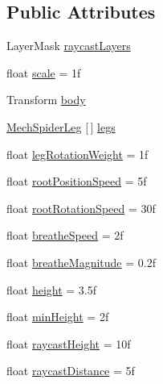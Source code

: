 \subsection*{Public Attributes}
\begin{DoxyCompactItemize}
\item 
Layer\+Mask \mbox{\hyperlink{class_root_motion_1_1_demos_1_1_mech_spider_af6d3d42998e9a682b4cca494695c46b2}{raycast\+Layers}}
\item 
float \mbox{\hyperlink{class_root_motion_1_1_demos_1_1_mech_spider_a4b5c11a7eb6b181ea183fcd760c7417b}{scale}} = 1f
\item 
Transform \mbox{\hyperlink{class_root_motion_1_1_demos_1_1_mech_spider_a179284d28e1c4c1d1afcba0256c7590c}{body}}
\item 
\mbox{\hyperlink{class_root_motion_1_1_demos_1_1_mech_spider_leg}{Mech\+Spider\+Leg}} \mbox{[}$\,$\mbox{]} \mbox{\hyperlink{class_root_motion_1_1_demos_1_1_mech_spider_a98958812219636fe9d017f7ce2aa8b72}{legs}}
\item 
float \mbox{\hyperlink{class_root_motion_1_1_demos_1_1_mech_spider_ac3d9e786bab440f546dc03b364e80508}{leg\+Rotation\+Weight}} = 1f
\item 
float \mbox{\hyperlink{class_root_motion_1_1_demos_1_1_mech_spider_aa3a5b02fc41657a98911de6a3ee0b847}{root\+Position\+Speed}} = 5f
\item 
float \mbox{\hyperlink{class_root_motion_1_1_demos_1_1_mech_spider_a419e24b9102b8b3c1f063d565a0d7721}{root\+Rotation\+Speed}} = 30f
\item 
float \mbox{\hyperlink{class_root_motion_1_1_demos_1_1_mech_spider_a0043c5571cff21a6cd73bc9bf323fbcd}{breathe\+Speed}} = 2f
\item 
float \mbox{\hyperlink{class_root_motion_1_1_demos_1_1_mech_spider_a59b58155146338b1b1f51cfd5333ba65}{breathe\+Magnitude}} = 0.\+2f
\item 
float \mbox{\hyperlink{class_root_motion_1_1_demos_1_1_mech_spider_a8c7358844e0719e2fb1eb4b99f0a81da}{height}} = 3.\+5f
\item 
float \mbox{\hyperlink{class_root_motion_1_1_demos_1_1_mech_spider_a57c05e3d0491165f37c49058d2c9b956}{min\+Height}} = 2f
\item 
float \mbox{\hyperlink{class_root_motion_1_1_demos_1_1_mech_spider_afea87a041ecd73dd2fec30801e241d6c}{raycast\+Height}} = 10f
\item 
float \mbox{\hyperlink{class_root_motion_1_1_demos_1_1_mech_spider_a6ea0c3fc343686bd547db42c7351662b}{raycast\+Distance}} = 5f
\end{DoxyCompactItemize}


